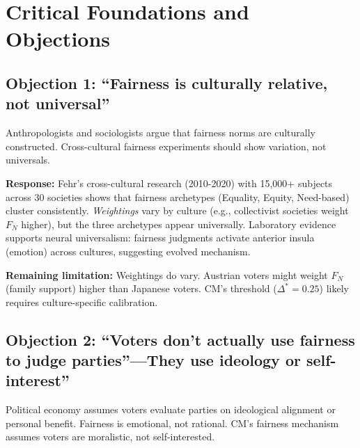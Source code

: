 \section{Critical Foundations and Objections}
\label{sec:cm-foundations}

\subsection{Objection 1: ``Fairness is culturally relative, not universal''}

\begin{tcolorbox}[colback=red!5!white, colframe=red!50!black,
    title=Objection: Cultural Relativism in Fairness]
Anthropologists and sociologists argue that fairness norms are culturally constructed.
Cross-cultural fairness experiments should show variation, not universals.
\end{tcolorbox}

\textbf{Response:} Fehr's cross-cultural research (2010-2020) with 15,000+ subjects across
30 societies shows that fairness archetypes (Equality, Equity, Need-based) cluster consistently.
\textit{Weightings} vary by culture (e.g., collectivist societies weight $F_N$ higher), but
the three archetypes appear universally. Laboratory evidence supports neural universalism:
fairness judgments activate anterior insula (emotion) across cultures, suggesting evolved mechanism.

\textbf{Remaining limitation:} Weightings do vary. Austrian voters might weight $F_N$ (family
support) higher than Japanese voters. CM's threshold ($\Delta^* = 0.25$) likely requires
culture-specific calibration.

\subsection{Objection 2: ``Voters don't actually use fairness to judge parties''---They use ideology or self-interest''}

\begin{tcolorbox}[colback=red!5!white, colframe=red!50!black,
    title=Objection: Rational Choice Voter Model]
Political economy assumes voters evaluate parties on ideological alignment or personal benefit.
Fairness is emotional, not rational. CM's fairness mechanism assumes voters are moralistic,
not self-interested.
\end{tcolorbox}

